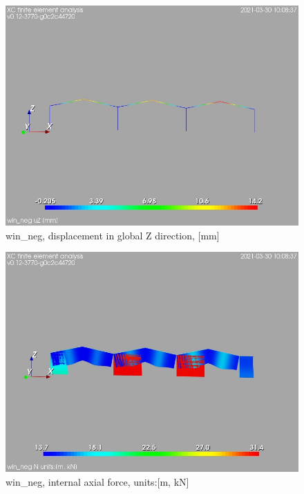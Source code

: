 \begin{figure}
\begin{center}
\includegraphics[width=\linewidth]{calc_results/sole_zeinali/text/graphics/resSimplLC/win_negtotaluZ}
\caption{win_neg, displacement in global Z direction, [mm]}
\end{center}
\end{figure}
\begin{figure}
\begin{center}
\includegraphics[width=\linewidth]{calc_results/sole_zeinali/text/graphics/resSimplLC/win_negallMemberSetN}
\caption{win_neg, internal axial force, units:[m, kN]}
\end{center}
\end{figure}
